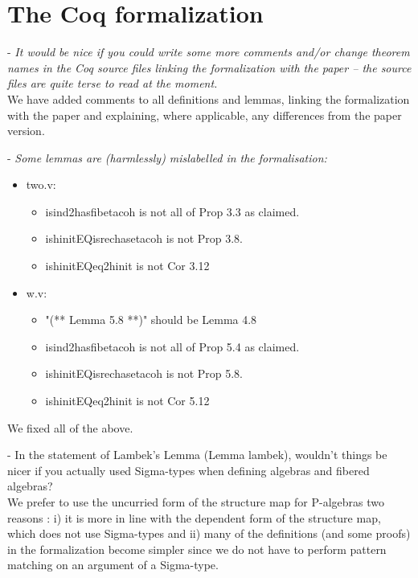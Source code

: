 \documentclass[11pt, oneside]{article}   	%
\begin{document}
\section{The Coq formalization}

- \emph{It would be nice if you could write some more comments and/or change theorem names in the Coq source files linking the formalization with the paper -- the source files are quite terse to read at the moment.} \\ 

We have added comments to all definitions and lemmas, linking the formalization with the paper and explaining, where applicable, any differences from the paper version. 

- \emph{Some lemmas are (harmlessly) mislabelled in the formalisation:}

\begin{itemize}
\item  two.v:
 \begin{itemize}
 \item isind2hasfibetacoh is not all of Prop 3.3 as claimed.
 \item ishinitEQisrechasetacoh is not Prop 3.8.
 \item ishinitEQeq2hinit is not Cor 3.12
\end{itemize}
\item  w.v:
\begin{itemize}
 \item "(** Lemma 5.8 **)" should be Lemma 4.8
 \item isind2hasfibetacoh is not all of Prop 5.4 as claimed.
 \item ishinitEQisrechasetacoh is not Prop 5.8.
 \item ishinitEQeq2hinit is not Cor 5.12 \\ 
\end{itemize}
\end{itemize}

We fixed all of the above.

- In the statement of Lambek's Lemma (Lemma lambek), wouldn't things be nicer if you actually used Sigma-types when defining algebras and fibered algebras? \\

We prefer to use the uncurried form of the structure map for P-algebras two reasons : 
   i) it is more in line with the dependent form of the structure map, which does not use Sigma-types and
   ii) many of the definitions (and some proofs) in the formalization become simpler since we do not have to perform pattern matching on an argument of a Sigma-type. 
\end{document}
